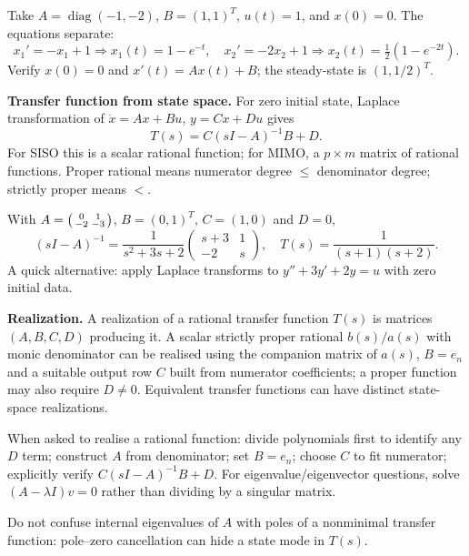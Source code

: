 \documentclass[10pt,a4paper]{article}
\begin{document}
\begin{workbox}[title={WORKED: complete forced solution}]
Take $A=\operatorname{diag}(-1,-2)$, $B=(1,1)^T$, $u(t)=1$, and $x(0)=0$. The equations separate:
\[x_1'=-x_1+1\Rightarrow x_1(t)=1-e^{-t},\quad x_2'=-2x_2+1\Rightarrow x_2(t)=\tfrac12(1-e^{-2t}).\]
Verify $x(0)=0$ and $x'(t)=Ax(t)+B$; the steady-state is $(1,1/2)^T$.
\end{workbox}
\begin{formbox}\textbf{Transfer function from state space.} For zero initial state, Laplace transformation of $\dot x=Ax+Bu$, $y=Cx+Du$ gives
\[\boxed{T(s)=C(sI-A)^{-1}B+D.}\]
For SISO this is a scalar rational function; for MIMO, a $p\times m$ matrix of rational functions. Proper rational means numerator degree $\le$ denominator degree; strictly proper means $<$.
\end{formbox}
\begin{workbox}[title={WORKED: transfer function of an oscillator}]
With $A=\begin{psmallmatrix}0&1\\-2&-3\end{psmallmatrix}$, $B=(0,1)^T$, $C=(1,0)$ and $D=0$,
\[(sI-A)^{-1}=\frac1{s^2+3s+2}\begin{pmatrix}s+3&1\\-2&s\end{pmatrix},\quad \boxed{T(s)=\frac1{(s+1)(s+2)}}.\]
A quick alternative: apply Laplace transforms to $y''+3y'+2y=u$ with zero initial data.
\end{workbox}
\begin{defbox}\textbf{Realization.} A realization of a rational transfer function $T(s)$ is matrices $(A,B,C,D)$ producing it. A scalar strictly proper rational $b(s)/a(s)$ with monic denominator can be realised using the companion matrix of $a(s)$, $B=e_n$ and a suitable output row $C$ built from numerator coefficients; a proper function may also require $D\ne0$. Equivalent transfer functions can have distinct state-space realizations.\end{defbox}
\begin{exambox}When asked to realise a rational function: divide polynomials first to identify any $D$ term; construct $A$ from denominator; set $B=e_n$; choose $C$ to fit numerator; explicitly verify $C(sI-A)^{-1}B+D$. For eigenvalue/eigenvector questions, solve $(A-\lambda I)v=0$ rather than dividing by a singular matrix.\end{exambox}
\begin{warnbox}Do not confuse internal eigenvalues of $A$ with poles of a nonminimal transfer function: pole--zero cancellation can hide a state mode in $T(s)$.\end{warnbox}
\end{document}

